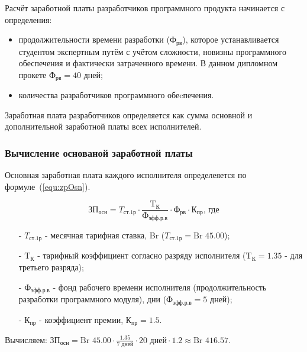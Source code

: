 Расчёт заработной платы разработчиков программного продукта начинается с определения:

\begin{itemize}
    \item продолжительности времени разработки ($\text{Ф}_{\text{рв}}$),
    которое устанавливается студентом экспертным путём с учётом сложности,
    новизны программного обеспечения и фактически затраченного времени.
    В данном дипломном прокете $\text{Ф}_{\text{рв}} = 40\text{ дней}$;
    \item количества разработчиков программного обеcпечения.
\end{itemize}

Заработная плата разработчиков определяется как сумма основной и дополнительной заработной платы всех исполнителей.

\subsubsection*{Вычисление основаной заработной платы}

Основная заработная плата каждого исполнителя определеяется по формуле~(\ref{equ:zpOsn}).

\begin{equation}
    \label{equ:zpOsn}
    \text{ЗП}_\text{осн} = T_\text{ст.1р} \cdot \frac{ \text{T}_\text{К} }{ \text{Ф}_\text{эфф.р.в} } \cdot \text{Ф}_\text{рв} \cdot \text{К}_\text{пр} \text{, где}
\end{equation}

\begin{enumerate}
    \item[-] $T_\text{ст.1р}$ - месячная тарифная ставка, Br
    ($T_\text{ст.1р} = \text{Br } 45.00$);
    \item[-] $\text{T}_\text{К}$ - тарифный коэффициент согласно разряду исполнителя \cite{RBMesTarifStavka2019} \cite{RBMesTarifStavka2023}
    ($\text{T}_\text{К} = 1.35$ - для третьего разряда);
    \item[-] $\text{Ф}_\text{эфф.р.в}$ - фонд рабочего времени исполнителя (продолжительность разработки программного модуля), дни
    ($\text{Ф}_\text{эфф.р.в} = 5\text{ дней}$);
    \item[-] $\text{К}_\text{пр}$ - коэффициент премии, $\text{К}_\text{пр} = 1.5$.
\end{enumerate}

Вычисляем: $\text{ЗП}_\text{осн} = \text{Br } 45.00 \cdot \frac{ 1.35 }{ 7 \text{ дней}  } \cdot 20 \text{ дней} \cdot 1.2 \approx \text{Br } 416.57$.

